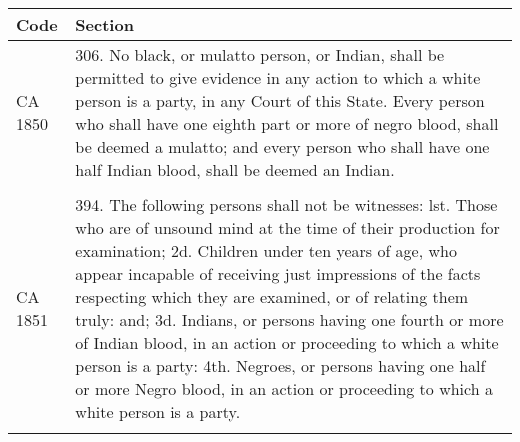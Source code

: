 \documentclass[12pt,]{article}
\begin{document}
\begin{longtable}[]{@{}ll@{}}
\toprule
\begin{minipage}[b]{0.17\columnwidth}\raggedright
Code\strut
\end{minipage} & \begin{minipage}[b]{0.77\columnwidth}\raggedright
Section\strut
\end{minipage}\tabularnewline
\midrule
\endhead
\begin{minipage}[t]{0.17\columnwidth}\raggedright
CA 1850\strut
\end{minipage} & \begin{minipage}[t]{0.77\columnwidth}\raggedright
306. No black, or mulatto person, or Indian, shall be permitted to give
evidence in any action to which a white person is a party, in any Court
of this State. Every person who shall have one eighth part or more of
negro blood, shall be deemed a mulatto; and every person who shall have
one half Indian blood, shall be deemed an Indian.\strut
\end{minipage}\tabularnewline
\begin{minipage}[t]{0.17\columnwidth}\raggedright
\strut
\end{minipage} & \begin{minipage}[t]{0.77\columnwidth}\raggedright
\strut
\end{minipage}\tabularnewline
\begin{minipage}[t]{0.17\columnwidth}\raggedright
CA 1851\strut
\end{minipage} & \begin{minipage}[t]{0.77\columnwidth}\raggedright
394. The following persons shall not be witnesses: lst. Those who are of
unsound mind at the time of their production for examination; 2d.
Children under ten years of age, who appear incapable of receiving just
impressions of the facts respecting which they are examined, or of
relating them truly: and; 3d. Indians, or persons having one fourth or
more of Indian blood, in an action or proceeding to which a white person
is a party: 4th. Negroes, or persons having one half or more Negro
blood, in an action or proceeding to which a white person is a
party.\strut
\end{minipage}\tabularnewline
\begin{minipage}[t]{0.17\columnwidth}\raggedright
\strut
\end{minipage} & \begin{minipage}[t]{0.77\columnwidth}\raggedright
\strut
\end{minipage}\tabularnewline

\end{longtable}
\end{document}
